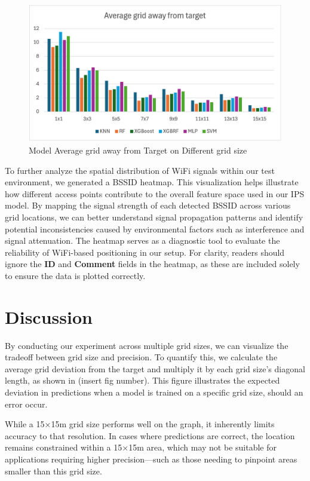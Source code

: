 \documentclass[conference]{IEEEtran}
\begin{document}
	\begin{figure}[htbp]
		\centerline{\includegraphics[scale=0.65]{image1.png}}
		\caption{Model Average grid away from Target on Different grid size}
		\label{fig2}
	\end{figure}
	
	To further analyze the spatial distribution of WiFi signals within our test environment, we generated a BSSID heatmap. This visualization helps illustrate how different access points contribute to the overall feature space used in our IPS model. By mapping the signal strength of each detected BSSID across various grid locations, we can better understand signal propagation patterns and identify potential inconsistencies caused by environmental factors such as interference and signal attenuation. The heatmap serves as a diagnostic tool to evaluate the reliability of WiFi-based positioning in our setup. For clarity, readers should ignore the \textbf{ID} and \textbf{Comment} fields in the heatmap, as these are included solely to ensure the data is plotted correctly.
	
	
	\section{Discussion}
	By conducting our experiment across multiple grid sizes, we can visualize the tradeoff between grid size and precision. To quantify this, we calculate the average grid deviation from the target and multiply it by each grid size’s diagonal length, as shown in (insert fig number). This figure illustrates the expected deviation in predictions when a model is trained on a specific grid size, should an error occur.
	
	While a 15×15m grid size performs well on the graph, it inherently limits accuracy to that resolution. In cases where predictions are correct, the location remains constrained within a 15×15m area, which may not be suitable for applications requiring higher precision—such as those needing to pinpoint areas smaller than this grid size.
	
\end{document}
